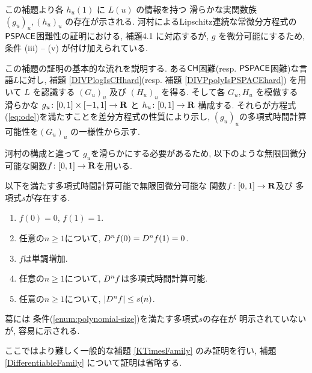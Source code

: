  この補題より各 $h_u(1)$ に $L(u)$ の情報を持つ
 滑らかな実関数族 $(g_u)_u, (h_u)_u$ の存在が示される.
 河村によるLipschitz連続な常微分方程式の$\mathsf{PSPACE}$困難性の証明における,
 補題4.1 に対応するが,
 $g$ を微分可能にするため, 条件 (iii) -- (v) が付け加えられている.


 この補題の証明の基本的な流れを説明する.
 ある$\mathsf{CH}$困難(resp. $\mathsf{PSPACE}$困難)な言語$L$に対し, 
 補題 \ref{DIVPlogIsCHhard}(resp. 補題 \ref{DIVPpolyIsPSPACEhard})
 を用いて $L$ を認識する $(G_u)_u$ 
 及び $(H_u)_u$ を得る.
 そして各 $G_u, H_u$ を模倣する
 滑らかな $g_u \colon [0,1] \times [-1, 1] \to \mathbf R$ 
 と $h_u \colon [0,1] \to \mathbf R$ 構成する.
 それらが方程式(\ref{eq:ode})を満たすことを差分方程式の性質により示し,
 $(g_u)_u$の多項式時間計算可能性を$(G_u)_u$ の一様性から示す.

河村\cite[補題4.1]{kawamura2010lipschitz}の構成と違って
$g_u$を滑らかにする必要があるため, 
以下のような無限回微分可能な関数$f \colon [0,1] \to \mathbf R$を用いる. 

 \begin{lemma}
  \label{SmoothFunction}
  以下を満たす多項式時間計算可能で無限回微分可能な
  関数$f \colon [0,1] \to \mathbf R$及び
  多項式$s$が存在する.
  \begin{enumerate}
   \item $f(0) = 0$, $f(1) = 1$. 
   \item 任意の$n \ge 1$について, $D ^n f (0) = D ^n f (1) = 0$. 
   \item $f$は単調増加. 
   \item 任意の$n \ge 1$について, $D ^n f$は多項式時間計算可能.
   \item \label{enum:polynomial-size}
     任意の$n \ge 1$について, $|D^n f| \le s(n)$. 
  \end{enumerate}
 \end{lemma}

葛\cite[補題3.6]{ko1991complexity}には
条件(\ref{enum:polynomial-size})を満たす多項式$s$の存在が
明示されていないが, 
容易に示される.

 ここではより難しく一般的な補題 \ref{KTimesFamily} のみ証明を行い,
 補題 \ref{DifferentiableFamily} について証明は省略する.


